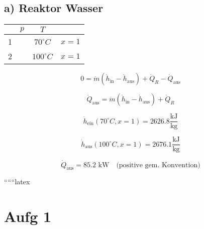 \subsection*{a) Reaktor Wasser}

\begin{tabular}{|c|c|c|c|}
\hline
 & $p$ & $T$ & \\
\hline
1 &  & $70^\circ C$ & $x=1$ \\
\hline
2 &  & $100^\circ C$ & $x=1$ \\
\hline
\end{tabular}

\[
0 = \dot{m} (\dot{h}_{\text{in}} - \dot{h}_{\text{aus}}) + \dot{Q}_R - \dot{Q}_{\text{aus}}
\]

\[
\dot{Q}_{\text{aus}} = \dot{m} (\dot{h}_{\text{in}} - \dot{h}_{\text{aus}}) + \dot{Q}_R
\]

\[
\dot{h}_{\text{ein}} (70^\circ C, x=1) = 2626.8 \frac{\text{kJ}}{\text{kg}}
\]

\[
\dot{h}_{\text{aus}} (100^\circ C, x=1) = 2676.1 \frac{\text{kJ}}{\text{kg}}
\]

\[
\dot{Q}_{\text{aus}} = 85.2 \text{ kW} \quad \text{(positive gem. Konvention)}
\]

``````latex


\section*{Aufg 1}